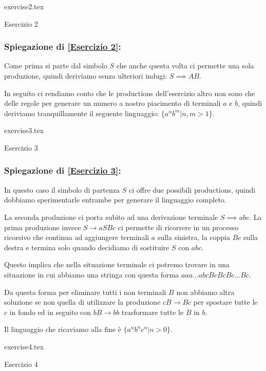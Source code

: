 \documentclass[class=book, crop=false, oneside, 12pt]{standalone}
\begin{document}
\begin{table}[H]
	\centering
	{exercise2.tex}
    \caption{Esercizio 2}
    \label{Esercizio 2}
\end{table}
\subsubsection*{Spiegazione di \ref{Esercizio 2}:}
Come prima si parte dal simbolo $S$ che anche questa volta ci permette una sola produzione, quindi deriviamo senza ulteriori indugi: $S \implies AB$.

In seguito ci rendiamo conto che le productions dell'esercizio altro non sono che delle regole per generare un numero a nostro piacimento di terminali $a$ e $b$, quindi deriviamo tranquillamente il seguente linguaggio: $\{a^n b^m |n,m>1\}$.

\begin{table}[H]
	\centering
	{exercise3.tex}
    \caption{Esercizio 3}
    \label{Esercizio 3}
\end{table}
\subsubsection*{Spiegazione di \ref{Esercizio 3}:}
In questo caso il simbolo di partenza $S$ ci offre due possibili productions, quindi dobbiamo sperimentarle entrambe per generare il linguaggio completo.

La seconda produzione ci porta subito ad una derivazione terminale $S \implies abc$.
La prima produzione invece $S \to aSBc$ ci permette di ricorrere in un processo ricorsivo che continua ad aggiungere terminali $a$ sulla sinistra, la coppia $Bc$ sulla destra e termina solo quando decidiamo di sostituire $S$ con $abc$.

Questo implica che nella situazione terminale ci potremo trovare in una situazione in cui abbiamo una stringa con questa forma $aaa...abcBcBcBc...Bc$.

Da questa forma per eliminare tutti i non terminali $B$ non abbiamo altra soluzione se non quella di utilizzare la produzione $cB \to Bc$ per spostare tutte le $c$ in fondo ed in seguito con $bB \to bb$ trasformare tutte le $B$ in $b$.

Il linguaggio che ricaviamo alla fine è $\{a^nb^nc^n | n>0\}$.

\begin{table}[H]
	\centering
	{exercise4.tex}
    \caption{Esercizio 4}
    \label{Esercizio 4}
\end{table}
\end{document}
